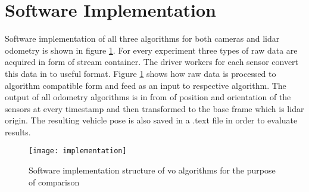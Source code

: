 \section{Software Implementation}
Software implementation of all three algorithms for both cameras and \acrshort{lidar} odometry is shown in figure \ref{fig:implementation}. For every experiment three types of raw data are acquired in form of stream container. The driver workers for each sensor convert this data in to useful format. Figure \ref{fig:implementation} shows how raw data is processed to algorithm compatible form and feed as an input to respective algorithm. The output of all odometry algorithms is in from of position and orientation of the sensors at every timestamp and then transformed to the base frame which is \acrshort{lidar} origin. The resulting vehicle pose is also saved in a .text file in order to evaluate results.
\begin{figure}[H]
	\centering
	\texttt{[image: implementation]}
	\caption{Software implementation structure of \acrshort{vo} algorithms for the purpose of comparison}
	\label{fig:implementation}
\end{figure}

